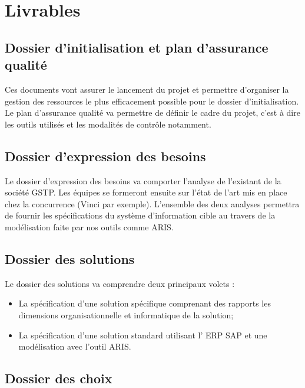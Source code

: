 \section{Livrables}

\subsection{Dossier d'initialisation et plan d'assurance qualité}

Ces documents vont assurer le lancement du projet et permettre d'organiser
la gestion des ressources le plus efficacement possible pour le dossier d'initialisation.
Le plan d'assurance qualité va permettre de définir le cadre du projet, c'est à dire les outils utilisés et les modalités de contrôle notamment. 

\subsection{Dossier d'expression des besoins}

Le dossier d'expression des besoins va comporter l'analyse de l'existant
de la société GSTP. Les équipes se formeront ensuite sur l'état de l'art
mis en place chez la concurrence (Vinci par exemple). L'ensemble des deux
analyses permettra de fournir les spécifications du système d'information cible
au travers de la modélisation faite par nos outils comme ARIS. 

\subsection{Dossier des solutions}

Le dossier des solutions va comprendre deux principaux volets :
\begin{itemize}
    \item La spécification d'une solution spécifique comprenant des rapports
        les dimensions organisationnelle et informatique de la solution;
    \item La spécification d'une solution standard utilisant l' ERP SAP et une
        modélisation avec l'outil ARIS.
\end{itemize}

\subsection{Dossier des choix}

